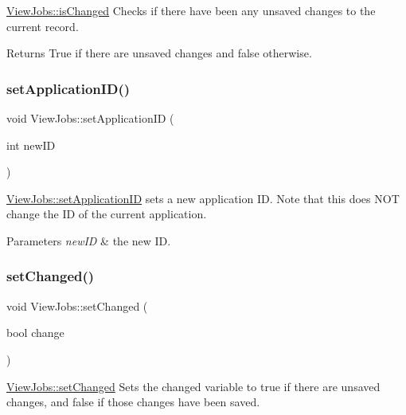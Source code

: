 \hyperlink{class_view_jobs_a5f75b45d28ce7f4a8050ce9ce0f44350}{View\+Jobs\+::is\+Changed} Checks if there have been any unsaved changes to the current record. 

\begin{DoxyReturn}{Returns}
True if there are unsaved changes and false otherwise. 
\end{DoxyReturn}
\mbox{\label{class_view_jobs_acd43a8c32ab9bca7e40ecc99e51da9b8}} 
\subsubsection{\texorpdfstring{set\+Application\+I\+D()}{setApplicationID()}}
{\footnotesize\ttfamily void View\+Jobs\+::set\+Application\+ID (\begin{DoxyParamCaption}\item[{int}]{new\+ID }\end{DoxyParamCaption})}



\hyperlink{class_view_jobs_acd43a8c32ab9bca7e40ecc99e51da9b8}{View\+Jobs\+::set\+Application\+ID} sets a new application ID. Note that this does N\+OT change the ID of the current application. 


\begin{DoxyParams}{Parameters}
{\em new\+ID} & the new ID. \\
\hline
\end{DoxyParams}
\mbox{\label{class_view_jobs_a3cba868c6deadaf4b35c18982f7ec35e}} 
\subsubsection{\texorpdfstring{set\+Changed()}{setChanged()}}
{\footnotesize\ttfamily void View\+Jobs\+::set\+Changed (\begin{DoxyParamCaption}\item[{bool}]{change }\end{DoxyParamCaption})}



\hyperlink{class_view_jobs_a3cba868c6deadaf4b35c18982f7ec35e}{View\+Jobs\+::set\+Changed} Sets the changed variable to true if there are unsaved changes, and false if those changes have been saved. 


